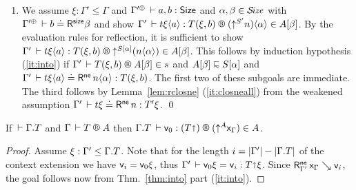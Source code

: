 \documentclass[acmlarge,review,anonymous]{acmart}\settopmatter{printfolios=true}
\makeatletter
\newcommand{\LONGVERSION}[1]{}
\newenvironment{proof*}[1][\proofname]{\par
  \normalfont \topsep6\p@\@plus6\p@\relax
  \trivlist
  \item[\@proofindent\hskip\labelsep
        {\@proofnamefont #1\@addpunct{.}}]\ignorespaces
}{%
  \endtrivlist\@endpefalse
}
\makeatother
\begin{document}
{\begin{proof*}
\begin{caselist}
\begin{enumerate}
\item We assume $\xi : \Gamma' \leq \Gamma$ and
$\resurrect{\Gamma'} \der a, b : \Size$ and $\alpha,\beta \in \mathcal{S}\!\mathit{ize}$ with
$\LRSize {\resurrect{\Gamma'}} b \beta$ and show
$\LR {\Gamma'} {t\xi\ann a} {T(\xi,b)} {(\up {S'} n) \ann \alpha} {A[\beta]}$.
By the evaluation rules for reflection, it is sufficient to show
$\LR {\Gamma'} {t\xi\ann a} {T(\xi,b)} {\up {S[\alpha]} (n \ann \alpha)} {A[\beta]}$.
This follows by induction hypothesis (\ref{it:into}) if
$\LRTS {\Gamma'} {T(\xi,b)} {A[\beta]} s$ and $A[\beta] \shape S[\alpha]$ and
$\Gamma' \,\vdash t\xi\langle a\rangle \doteq \mathsf{R}^{\mathsf{ne}}\, n \langle\alpha\rangle : T(\xi,b)$.
The first two of these subgoals are immediate.
The third follows by Lemma~\ref{lem:rclosne} (\ref{it:closneall}) from the
weakened assumption
 $\Gamma' \,\vdash t\xi \doteq \mathsf{R}^{\mathsf{ne}}\, n : T'\xi$.
%
\qed
\end{enumerate}
%
\end{caselist}
\end{proof*}
} %

\LONGVERSION{
\begin{corollary}[One-to-one]
\label{cor:oneone}
\bla
\begin{enumerate}
\item
If\/ $\LRSize \Gamma a \alpha$ and $\LRSize \Gamma {a'} \alpha$ then $a = a'$.
\item
If\/ $\LRT \Gamma T A \ell$ and $\LRT \Gamma {T'} A {\ell'}$ then $\Gamma \der T = T'$.
\end{enumerate}
\end{corollary}
} %
\begin{corollary}
  \label{cor:fresh}
  If\/ $\,\vdash \Gamma. T$ and %
  $\RG \Gamma T A$
  then $\LR {\cext \Gamma T} {\ind 0} {(T \slift)} {(\up A \var\Gamma)} A$.
\end{corollary}
\begin{proof}
  Assume $\xi : \Gamma' \leq \Gamma. T$.
  Note that for the length
  $i = |\Gamma'| - |\Gamma. T|$ of the context extension
  we have $\mathsf{v}_{i} = \mathsf{v}_{0} \xi$, thus
  $\Gamma' \,\vdash \mathsf{v}_{0} \xi = \mathsf{v}_{i} : T \mathord{\shortuparrow} \xi$.
  Since $\mathsf{R}^{\mathsf{ne}}_{\Gamma'} \, \mathsf{x}_{\Gamma} \searrow \mathsf{v}_{i}$,
  the goal follows now from Thm.~\ref{thm:into} part (\ref{it:into}).
\end{proof}
\end{document}

